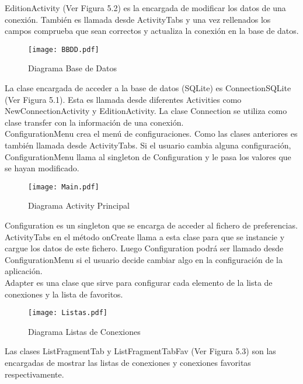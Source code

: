 EditionActivity (Ver Figura 5.2) es la encargada de modificar los datos de una conexión. También es llamada desde ActivityTabs y una vez rellenados los campos comprueba que sean correctos y actualiza la conexión en la base de datos.

\begin{figure}[h]
\begin{center}
\texttt{[image: BBDD.pdf]}
\end{center}
\caption{Diagrama Base de Datos}
\end{figure}

La clase encargada de acceder a la base de datos (SQLite) es ConnectionSQLite (Ver Figura 5.1). Esta es llamada desde diferentes Activities como NewConnectionActivity y EditionActivity. La clase Connection se utiliza como clase transfer con la información de una conexión.\\

ConfigurationMenu crea el menú de configuraciones. Como las clases anteriores es también llamada desde ActivityTabs. Si el usuario cambia alguna configuración, ConfigurationMenu llama al singleton de Configuration y le pasa los valores que se hayan modificado.

\begin{figure}[h]
\begin{center}
\texttt{[image: Main.pdf]}
\end{center}
\caption{Diagrama Activity Principal}
\end{figure}

Configuration es un singleton que se encarga de acceder al fichero de preferencias. ActivityTabs en el método onCreate llama a esta clase para que se instancie y cargue los datos de este fichero. Luego Configuration podrá ser llamado desde ConfigurationMenu si el usuario decide cambiar algo en la configuración de la aplicación.\\

Adapter es una clase que sirve para configurar cada elemento de la lista de conexiones y la lista de favoritos.\\

\begin{figure}[h]
\begin{center}
\texttt{[image: Listas.pdf]}
\end{center}
\caption{Diagrama Listas de Conexiones}
\end{figure}

Las clases ListFragmentTab y ListFragmentTabFav (Ver Figura 5.3) son las encargadas de mostrar las listas de conexiones y conexiones favoritas respectivamente.\\

